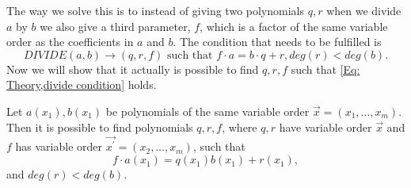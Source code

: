 The way we solve this is to instead of giving two polynomials $q,r$ when we divide $a$ by $b$ we also give a third parameter, $f$, which is a factor of the same variable order as the coefficients in $a$ and $b$. The condition that needs to be fulfilled is
\begin{equation}\label{Eq: Theory,divide condition}
  DIVIDE(a,b) \rightarrow (q,r,f) \text{ such that } f\cdot a=b\cdot q + r, deg(r) < deg(b).
\end{equation}
Now we will show that it actually is possible to find $q,r,f$ such that \ref{Eq: Theory,divide condition} holds.
\begin{theorem}
  Let $a(x_1),b(x_1)$ be polynomials of the same variable order $\vec{x}=(x_1,\ldots,x_m)$. Then it is possible to find polynomials $q,r,f$, where $q,r$ have variable order $\vec{x}$ and $f$ has variable order $\vec{x^\prime}=(x_2,\ldots,x_m)$, such that
  \begin{equation}\label{Eq: Theory,theorem,divide}
    f\cdot a(x_1)=q(x_1)b(x_1) + r(x_1),
  \end{equation}
  and $deg(r)<deg(b)$.
\end{theorem}
